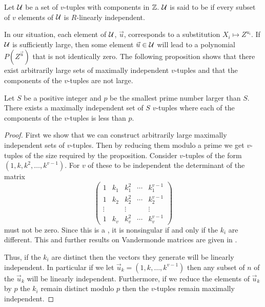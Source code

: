 \begin{definition}
Let $\cal U$ be a set of $v$-tuples with components in $\mathbb{Z}$.
$\cal U$ is said to be  if every subset of
$v$ elements of $\cal U$ is $R$-linearly independent.
\end{definition}

In our situation, each element of $\cal U$, $\vec{u}$, corresponds to
a substitution $X_i \mapsto Z^{u_i}$.  If ${\cal U}$ is sufficiently
large, then some element $\vec{u} \in {\cal U}$ will lead to a
polynomial $P(Z^{\vec{u}})$ that is not identically zero.  The
following proposition shows that there exist arbitrarily large sets of
maximally independent $v$-tuples and that the components of the
$v$-tuples are not large.

\begin{proposition}
\label{SPMod:Lemma:1:Prop}
Let $S$ be a positive integer and $p$ be the smallest prime number
larger than $S$.  There exists a maximally independent set of $S$
$v$-tuples where each of the components of the $v$-tuples is less than
$p$.
\end{proposition}

\begin{proof}
First we show that we can construct arbitrarily large maximally
independent sets of $v$-tuples.  Then by reducing them modulo a prime
we get $v$-tuples of the size required by the proposition. Consider
$v$-tuples of the form $(1, k, k^2, \ldots, k^{v-1})$.  For $v$ of
these to be independent the determinant of the matrix
\[
\begin{pmatrix}
1& k_1 & k_1^2 & \cdots & k_1^{v-1}\\
1& k_2 & k_2^2 & \cdots & k_2^{v-1}\\
\vdots& &\vdots& & \vdots\\
1& k_v & k_v^2 & \cdots & k_v^{v-1}\end{pmatrix}
\]
must not be zero.  Since this is a , it is
nonsingular if and only if the $k_i$ are different.  This and further
results on Vandermonde matrices are given in
.

Thus, if the $k_i$ are distinct then the vectors they generate will be
linearly independent.  In particular if we let $\vec{u}_k = (1, k,
\ldots, k^{v-1})$ then any subset of $n$ of the $\vec{u}_k$ will be
linearly independent.  Furthermore, if we reduce the elements of $\vec
u_k$ by $p$ the $k_i$ remain distinct modulo $p$ then the $v$-tuples
remain maximally independent.
\end{proof}

